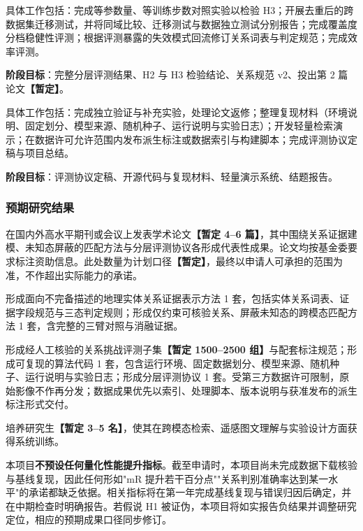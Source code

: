 具体工作包括：完成等参数量、等训练步数对照实验以检验 H3；开展去重后的跨数据集迁移测试，并将同域比较、迁移测试与数据独立测试分别报告；完成覆盖度分档稳健性评测；根据评测暴露的失效模式回流修订关系词表与判定规范；完成效率评测。

\textbf{阶段目标}：完整分层评测结果、H2 与 H3 检验结论、关系规范 v2、投出第 2 篇论文\textbf{【暂定】}。


具体工作包括：完成独立验证与补充实验，处理论文返修；整理复现材料（环境说明、固定划分、模型来源、随机种子、运行说明与实验日志）；开发轻量检索演示；在数据许可允许范围内发布派生标注或数据索引与构建脚本；完成评测协议定稿与项目总结。

\textbf{阶段目标}：评测协议定稿、开源代码与复现材料、轻量演示系统、结题报告。

\subsubsection{预期研究结果}


在国内外高水平期刊或会议上发表学术论文\textbf{【暂定 4--6 篇】}，其中围绕关系证据建模、未知态屏蔽的匹配方法与分层评测协议各形成代表性成果。论文均按基金委要求标注资助信息。此处数量为计划口径\textbf{【暂定】}，最终以申请人可承担的范围为准，不作超出实际能力的承诺。


形成面向不完备描述的地理实体关系证据表示方法 1 套，包括实体关系词表、证据字段规范与三态判定规则；形成仅约束可核验关系、屏蔽未知态的跨模态匹配方法 1 套，含完整的三臂对照与消融证据。


形成经人工核验的关系挑战评测子集\textbf{【暂定 1500--2500 组】}与配套标注规范；形成可复现的算法代码 1 套，包含运行环境、固定数据划分、模型来源、随机种子、运行说明与实验日志；形成分层评测协议 1 套。受第三方数据许可限制，原始影像不作再分发；数据成果优先以索引、处理脚本、版本说明与获准发布的派生标注形式交付。


培养研究生\textbf{【暂定 3--5 名】}，使其在跨模态检索、遥感图文理解与实验设计方面获得系统训练。


本项目\textbf{不预设任何量化性能提升指标}。截至申请时，本项目尚未完成数据下载核验与基线复现，因此任何形如"mR 提升若干百分点""关系判别准确率达到某一水平"的承诺都缺乏依据。相关指标将在第一年完成基线复现与错误归因后确定，并在中期检查时明确报告。若假说 H1 被证伪，本项目将如实报告负结果并调整研究定位，相应的预期成果口径同步修订。
